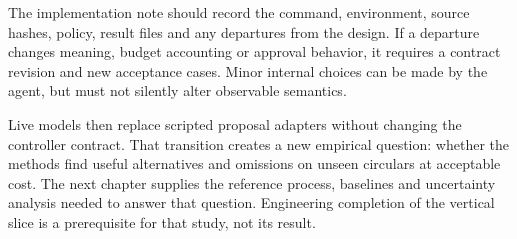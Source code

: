 The implementation note should record the command, environment, source hashes,
policy, result files and any departures from the design. If a departure changes
meaning, budget accounting or approval behavior, it requires a contract revision
and new acceptance cases. Minor internal choices can be made by the agent, but
must not silently alter observable semantics.

Live models then replace scripted proposal adapters without changing the controller
contract. That transition creates a new empirical question: whether the methods
find useful alternatives and omissions on unseen circulars at acceptable cost.
The next chapter supplies the reference process, baselines and uncertainty
analysis needed to answer that question. Engineering completion of the vertical
slice is a prerequisite for that study, not its result.

